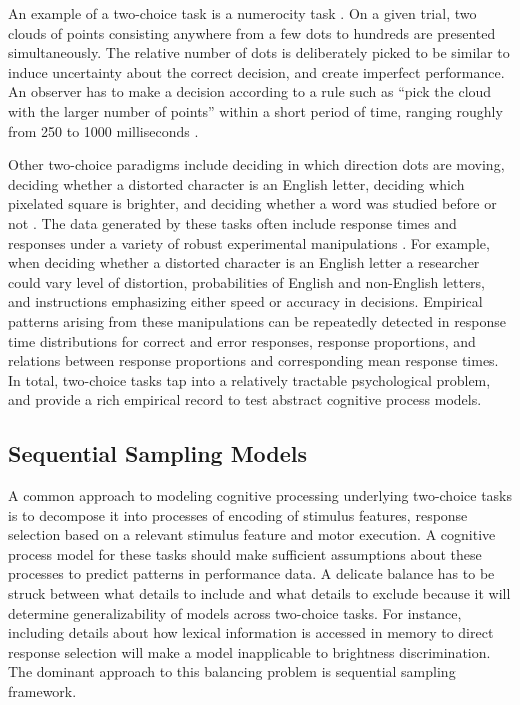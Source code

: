 \documentclass[12pt]{article}
\begin{document}
	An example of a two-choice task is a numerocity task \citep{RatLov2012}. On a given trial, two clouds of points consisting anywhere from a few dots to hundreds are presented simultaneously. The relative number of dots is deliberately picked to be similar to induce uncertainty about the correct decision, and create imperfect performance. An observer has to make a decision according to a rule such as “pick the cloud with the larger number of points” within a short period of time, ranging roughly from 250 to 1000 milliseconds \citep{RatLov2012}. 
    
	Other two-choice paradigms include deciding in which direction dots are moving, deciding whether a distorted character is an English letter, deciding which pixelated square is brighter, and deciding whether a word was studied before or not \citep{SmiRat2004,RatSmi2004,RatRou1998,PerVan2002}. The data generated by these tasks often include response times and responses under a variety of robust experimental manipulations \citep{Luc1986}. For example, when deciding whether a distorted character is an English letter a researcher could vary level of distortion, probabilities of English and non-English letters, and instructions emphasizing either speed or accuracy in decisions. Empirical patterns arising from these manipulations can be repeatedly detected in response time distributions for correct and error responses, response proportions, and relations between response proportions and corresponding mean response times. In total, two-choice tasks tap into a relatively tractable psychological problem, and provide a rich empirical record to test abstract cognitive process models.
    
\subsection{Sequential Sampling Models}
	A common approach to modeling cognitive processing underlying two-choice tasks is to decompose it into processes of encoding of stimulus features, response selection based on a relevant stimulus feature and motor execution. A cognitive process model for these tasks should make sufficient assumptions about these processes to predict patterns in performance data. A delicate balance has to be struck between what details to include and what details to exclude because it will determine generalizability of models across two-choice tasks. For instance, including details about how lexical information is accessed in memory to direct response selection will make a model inapplicable to brightness discrimination. The dominant approach to this balancing problem is sequential sampling framework. 
    
\end{document}
